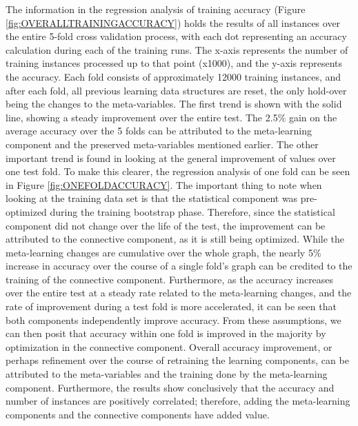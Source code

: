 The information in the regression analysis of training
accuracy (Figure \ref{fig:OVERALLTRAININGACCURACY}) holds the results of all instances
over the entire 5-fold cross validation process, with each dot representing an accuracy
calculation during each of the training runs. The x-axis represents the 
number of training instances processed up to that point (x1000), and the y-axis 
represents the accuracy. Each fold consists of approximately 12000 training 
instances, and after each fold, all previous learning data structures are reset, 
the only hold-over being the changes to the meta-variables. The first trend is shown 
with the solid line, showing a steady improvement over the entire test. 
The 2.5\% gain on the average accuracy over the 5 folds can be attributed to the 
meta-learning component and the preserved meta-variables mentioned earlier. The 
other important trend is found in looking at the general
improvement of values over one test fold. To make this clearer, the regression
analysis of one fold can be seen in Figure \ref{fig:ONEFOLDACCURACY}.  The important
thing to note when looking at the training data set is that the statistical component was
pre-optimized during the training bootstrap phase.  Therefore, since the
statistical component did not change over the life of the test, the improvement
can be attributed to the connective component, as it is still being optimized. 
While the meta-learning changes are cumulative over the whole graph, the nearly 
5\% increase in accuracy over the course of a single fold's graph can be credited 
to the training of the connective component. Furthermore, as the accuracy 
increases over the entire test at a steady rate related to the meta-learning changes, and the rate of
improvement during a test fold is more accelerated, it can be seen that both
components independently improve accuracy.  From these assumptions, we can then 
posit that accuracy within one fold is improved in the majority by 
optimization in the connective component.  Overall accuracy improvement, or 
perhaps refinement over the course of retraining the learning components, can be 
attributed to the meta-variables and the training done by the meta-learning 
component. Furthermore, the results show conclusively that the accuracy and 
number of instances are positively correlated; therefore, adding the meta-learning 
components and the connective components have added value.


